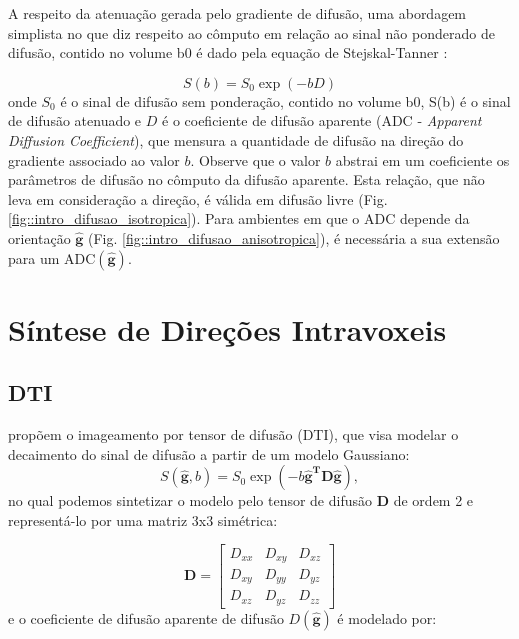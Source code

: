 \documentclass[
    12pt,                %
    oneside,            %
    a4paper,            %
    english,            %
    french,                %
    spanish,            %
    brazil                %
    ]{abntex2}
\begin{document}
A respeito da atenuação gerada pelo gradiente de difusão, uma abordagem simplista no que diz respeito ao cômputo em relação ao sinal não ponderado de difusão, contido no volume b0 é dado pela equação de Stejskal-Tanner \cite{DTI_Handbook}:

\begin{equation}
\label{eq::stanner}
    S(b) = S_0\exp{(-bD)}
\end{equation}
onde $S_0$ é o sinal de difusão sem ponderação, contido no volume b0, S(b) é o sinal de difusão atenuado e $D$ é o coeficiente de difusão aparente (ADC - \textit{Apparent Diffusion Coefficient}), que mensura a quantidade de difusão na direção do gradiente associado ao valor $b$. Observe que o valor $b$ abstrai em um coeficiente os parâmetros de difusão no cômputo da difusão aparente. Esta relação, que não leva em consideração a direção, é válida em difusão livre (Fig. \ref{fig::intro_difusao_isotropica}). Para ambientes em que o ADC depende da orientação $\mathbf{\hat{g}}$ (Fig. \ref{fig::intro_difusao_anisotropica}), é necessária a sua extensão para um ADC$(\mathbf{\hat{g}})$.

\section{Síntese de Direções Intravoxeis}

\subsection{DTI}
\label{sec::dti_limitacoes_hardi}

 propõem o imageamento por tensor de difusão (DTI), que visa modelar o decaimento do sinal de difusão a partir de um modelo Gaussiano: 
\begin{equation}
\label{eq::stanner}
    S(\mathbf{\hat{g}}, b) = S_0\exp{(-b\mathbf{\hat{g}^T}\mathbf{D}\mathbf{\hat{g}})}, 
\end{equation}
no qual podemos sintetizar o modelo pelo tensor de difusão $\mathbf{D}$ de ordem 2 e representá-lo por uma matriz 3x3 simétrica:

\begin{equation}
\label{eq::tensor}
\mathbf{D} = 
\begin{bmatrix}
D_{xx} & D_{xy} & D_{xz} \\ 
D_{xy} & D_{yy} & D_{yz} \\ 
D_{xz} & D_{yz} & D_{zz}  
\end{bmatrix}
\end{equation}
e o coeficiente de difusão aparente de difusão $D(\mathbf{\hat{g}})$ é modelado por:
\end{document}
